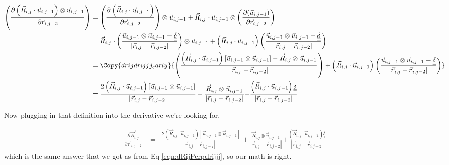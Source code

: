 \documentclass{article}
\renewcommand{\ij}{_{i,j}}
\newcommand{\ijj}{_{i,j-1}}
\newcommand{\ijk}{_{i,j-2}}
\newcommand{\ijjj}{_{i,j-2}}
\newcommand{\magn}[1]{\left\vert #1 \right\vert }
\renewcommand{\part}[2]{\frac{\partial #1 }{\partial #2}}
\newcommand{\ten}[1]{\underline{\underline{#1}}}
\newcommand{\rij}{\vec{r} \ij}
\newcommand{\Rij}{\vec{R} \ij}
\newcommand{\rijjj}{\vec{r} \ijjj}
\newcommand{\uijj}{\vec{u} \ijj}
\begin{document}
\begin{align*}
  \left(  
  \part{
  \left(\vec{R}\ij \cdot \vec{u} \ijj \right)\otimes \uijj}{\vec{r}\ijk}  
  \right)
  &= 
  \left(  
  \part{
  \left(\vec{R}\ij \cdot \vec{u} \ijj \right)}{\vec{r}\ijk}  
  \right)
  \otimes \uijj 
  + 
  \vec{R}\ij \cdot \vec{u} \ijj
  \otimes
  \left(  
  \part{
  ( \uijj  )}{\vec{r}\ijk}  
  \right)
  \\
  &= 
  \Rij \cdot 
  \left(
    \frac{\uijj \otimes \uijj - \ten{\delta}}{\magn{\rij - \rijjj}}
  \right)
  \otimes \uijj 
  + 
  \left(
  \vec{R}\ij \cdot \vec{u} \ijj
  \right)
  {
  \left(
  \frac{\uijj \otimes \uijj - \ten{\delta} }{\magn{\rij - \rijjj}}
  \right)
  }
  \\
  &= 
  \Copy{drijdrijjj_early}{
  \left(
    \frac{
      \left(
        \Rij\cdot \uijj 
      \right)
      \left[
       \uijj 
      \otimes \uijj 
      \right]
       - 
  \Rij 
  \otimes \uijj 
      }{\magn{\rij - \rijjj}}
  \right)
  + 
  \left(
  \vec{R}\ij \cdot \vec{u} \ijj
  \right)
  {
  \left(
  \frac{\uijj \otimes \uijj - \ten{\delta} }{\magn{\rij - \rijjj}}
  \right)
  }
  }
  \\
  &= 
    \frac{
  2
      \left(
        \Rij\cdot \uijj 
      \right)
      \left[
       \uijj 
      \otimes \uijj 
      \right]
      }{\magn{\rij - \rijjj}}
       - 
    \frac{
  \Rij 
  \otimes \uijj 
      }{\magn{\rij - \rijjj}}
  {
    -
  \frac{
  \left(
    \Rij 
    \cdot 
    \uijj 
  \right)
  \ten{\delta}
    }{\magn{\rij - \rijjj}}
  }
\end{align*}


Now plugging in that definition into the derivative we're looking for.

\begin{align*}
  \part{\vec{R}\ij ^ \bot}{\vec{r}\ijk}  &=  
  \boxed{
    \frac{
      -
  2
      \left(
        \Rij\cdot \uijj 
      \right)
      \left[
       \uijj 
      \otimes \uijj 
      \right]
      }{\magn{\rij - \rijjj}}
       + 
    \frac{
  \Rij 
  \otimes \uijj 
      }{\magn{\rij - \rijjj}}
  {
    +
  \frac{
  \left(
    \Rij 
    \cdot 
    \uijj 
  \right)
  \ten{\delta}
    }{\magn{\rij - \rijjj}}
  }
  }
\end{align*}
which is the same answer that we got as from Eq \ref{eqn:dRijPerpdrijjj}, so our math is
right.
\end{document}
